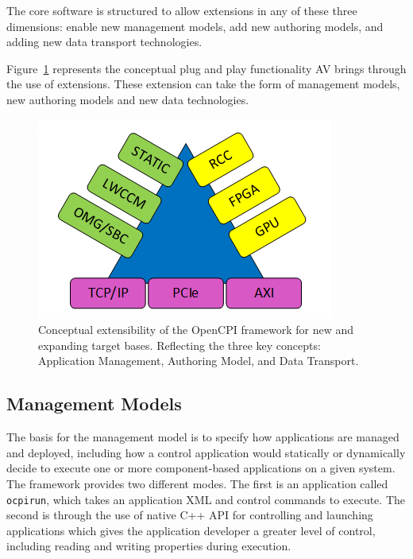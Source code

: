 The core software is structured to allow extensions in any of these three dimensions: enable new management models, add new authoring models, and adding new data transport technologies. \newline

Figure~\ref{fig:what_is_av} represents the conceptual plug and play functionality AV brings through the use of extensions. These extension can take the form of management models, new authoring models and new data technologies.

\begin{figure}[h]
\centerline{\includegraphics[scale=0.75]{./figures/pillars_of_ocpi.png}}
\caption{Conceptual extensibility of the OpenCPI framework for new and expanding target bases. Reflecting the three key concepts: Application Management, Authoring Model, and Data Transport.}
\label{fig:what_is_av}
\end{figure}

\subsection{Management Models}
\label{subsec:Mangement_models}
The basis for the management model is to specify how applications are managed and deployed, including how a control application would statically or dynamically decide to execute one or more component-based applications on a given system. The framework provides two different modes. The first is an application called \verb+ocpirun+, which takes an application XML and control commands to execute. The second is through the use of native C++ API for controlling and launching applications which gives the application developer a greater level of control, including reading and writing properties during execution.

